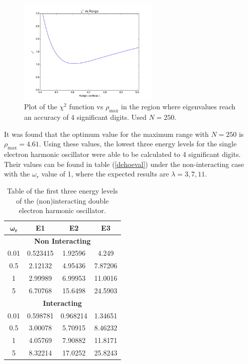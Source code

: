 \documentclass[a4paper,12pt]{report}
\begin{document}
\begin{figure}
\centering
 \includegraphics[width=0.6\textwidth]{SeHoRtest.png}
 \caption{Plot of the $\chi^2$ function vs $\rho_{\mathrm{max}}$ in the region where eigenvalues reach an accuracy of 4 significant digits. Used $N = 250$.}
 \label{fig:sehortest}
\end{figure}

It was found that the optimum value for the maximum range with $N = 250$ is $\rho_{\mathrm{max}} = 4.61$. Using these values, the lowest three energy levels for the single electron harmonic oscillator were able to be calculated to 4 significant digits. Their values can be found in table (\ref{dehoeval}) under the non-interacting case with the $\omega_r$ value of 1, where the expected results are $\lambda = 3,7,11$.

\begin{table}[h]
 \centering
\begin{center}
\begin{tabular}{|c|c|c|c|}\hline
$\mathbf{\omega_r}$ & \textbf{E1} & \textbf{E2} & \textbf{E3}\\\hline
\multicolumn{4}{|c|}{\textbf{Non Interacting}} \\\hline
0.01 & 0.523415 & 1.92596 & 4.249 \\\hline
0.5 & 2.12132 & 4.95436 & 7.87206 \\\hline
1 & 2.99989 & 6.99953 & 11.0016 \\\hline
5 & 6.70768 & 15.6498 & 24.5903 \\\hline
\multicolumn{4}{|c|}{\textbf{Interacting}} \\\hline
0.01 & 0.598781 & 0.968214 & 1.34651 \\\hline
0.5 & 3.00078 & 5.70915 & 8.46232 \\\hline
1 & 4.05769 & 7.90882 & 11.8171 \\\hline
5 & 8.32214 & 17.0252 & 25.8243 \\\hline
\end{tabular}
\end{center}
\caption{Table of the first three energy levels of the (non)interacting double electron harmonic oscillator.\label{tbl:dehoeval}}
\end{table}
\end{document}
